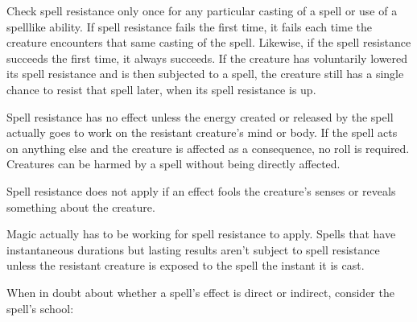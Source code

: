 
Check spell resistance only once for any particular casting of a spell or use of a spell\textendash like ability. If spell resistance fails the first time, it fails each time the creature encounters that same casting of the spell. Likewise, if the spell resistance succeeds the first time, it always succeeds. If the creature has voluntarily lowered its spell resistance and is then subjected to a spell, the creature still has a single chance to resist that spell later, when its spell resistance is up.

Spell resistance has no effect unless the energy created or released by the spell actually goes to work on the resistant creature's mind or body. If the spell acts on anything else and the creature is affected as a consequence, no roll is required. Creatures can be harmed by a spell without being directly affected. 

Spell resistance does not apply if an effect fools the creature's senses or reveals something about the creature.

Magic actually has to be working for spell resistance to apply. Spells that have instantaneous durations but lasting results aren't subject to spell resistance unless the resistant creature is exposed to the spell the instant it is cast. 

When in doubt about whether a spell's effect is direct or indirect, consider the spell's school:



